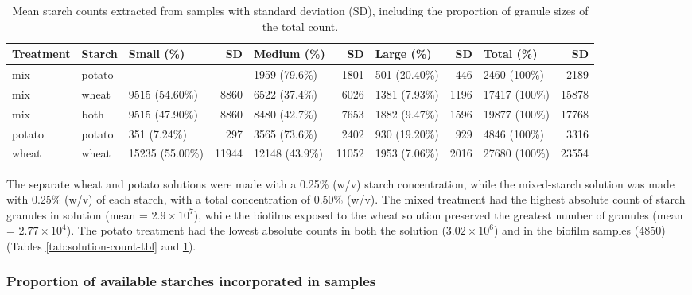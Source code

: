\documentclass[
]{article}
\begin{document}
\begin{table}

\caption{\label{tab:sample-count-tbl}Mean starch counts extracted from samples with standard 
             deviation (SD), including the proportion of granule sizes of the total count.}
\centering
\begin{tabular}[t]{l|l|l|r|l|r|l|r|l|r}
\hline
Treatment & Starch & Small (\%) & SD & Medium (\%) & SD & Large (\%) & SD & Total (\%) & SD\\
\hline
mix & potato &  &  & 1959 (79.6\%) & 1801 & 501 (20.40\%) & 446 & 2460 (100\%) & 2189\\
\hline
mix & wheat & 9515 (54.60\%) & 8860 & 6522 (37.4\%) & 6026 & 1381 (7.93\%) & 1196 & 17417 (100\%) & 15878\\
\hline
mix & both & 9515 (47.90\%) & 8860 & 8480 (42.7\%) & 7653 & 1882 (9.47\%) & 1596 & 19877 (100\%) & 17768\\
\hline
potato & potato & 351 (7.24\%) & 297 & 3565 (73.6\%) & 2402 & 930 (19.20\%) & 929 & 4846 (100\%) & 3316\\
\hline
wheat & wheat & 15235 (55.00\%) & 11944 & 12148 (43.9\%) & 11052 & 1953 (7.06\%) & 2016 & 27680 (100\%) & 23554\\
\hline
\end{tabular}
\end{table}

The separate wheat and potato solutions were made with a 0.25\% (w/v) starch
concentration, while the mixed-starch solution was made with 0.25\% (w/v) of each
starch, with a total concentration of 0.50\% (w/v).
The mixed treatment had the highest absolute count of starch granules in solution (mean = \ensuremath{2.9\times 10^{7}}),
while the biofilms exposed to the wheat solution preserved the greatest number of
granules
(mean = \ensuremath{2.77\times 10^{4}}).
The potato treatment had the lowest absolute counts in both the solution
(\ensuremath{3.02\times 10^{6}})
and in the biofilm samples
(4850)
(Tables \ref{tab:solution-count-tbl} and \ref{tab:sample-count-tbl}).

\hypertarget{proportion-of-available-starches-incorporated-in-samples}{%
\subsubsection{Proportion of available starches incorporated in samples}\label{proportion-of-available-starches-incorporated-in-samples}}
\end{document}
